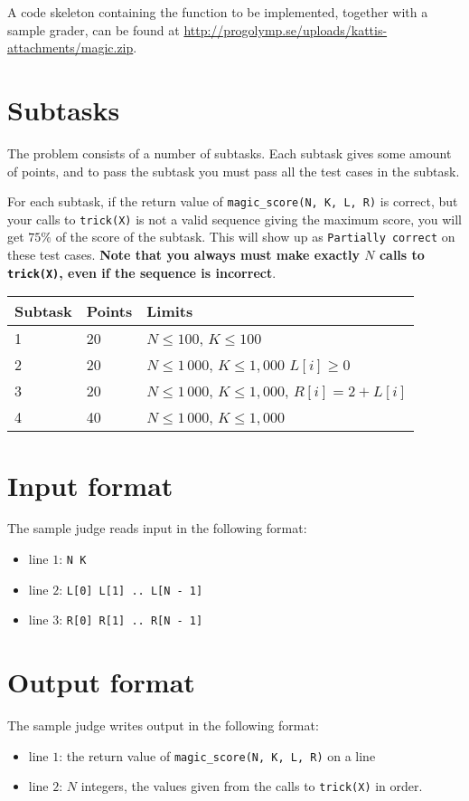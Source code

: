 A code skeleton containing the function to be implemented, together with a sample grader, can be found at
\url{http://progolymp.se/uploads/kattis-attachments/magic.zip}.

\section*{Subtasks}
The problem consists of a number of subtasks. Each subtask gives some amount of points, and to pass
the subtask you must pass all the test cases in the subtask.

For each subtask, if the return value of \texttt{magic\_score(N, K, L, R)} is correct, but your calls to \texttt{trick(X)}
is not a valid sequence giving the maximum score, you will get $75\%$ of the score of the subtask. This will show up as
\texttt{Partially correct} on these test cases. \textbf{Note that you always must make exactly $N$ calls to \texttt{trick(X)},
even if the sequence is incorrect}.

\begin{tabular}{|l|l|l|}
  \hline
  \textbf{Subtask} & \textbf{Points} & \textbf{Limits} \\ \hline
  1 & 20 & $N \le 100$, $K \le 100$ \\ \hline
  2 & 20 & $N \le 1\,000$, $K \le 1,000$ $L[i] \ge 0$\\ \hline
  3 & 20 & $N \le 1\,000$, $K \le 1,000$, $R[i] = 2 + L[i]$ \\ \hline
  4 & 40 & $N \le 1\,000$, $K \le 1,000$ \\ \hline
\end{tabular}

\section*{Input format}
The sample judge reads input in the following format:

\begin{itemize}
  \item line $1$: \texttt{N K}
  \item line $2$: \texttt{L[0] L[1] .. L[N - 1]}
  \item line $3$: \texttt{R[0] R[1] .. R[N - 1]}
\end{itemize}

\section*{Output format}
The sample judge writes output in the following format:

\begin{itemize}
  \item line $1$: the return value of \texttt{magic\_score(N, K, L, R)} on a line
  \item line $2$: $N$ integers, the values given from the calls to \texttt{trick(X)} in order.
\end{itemize}
